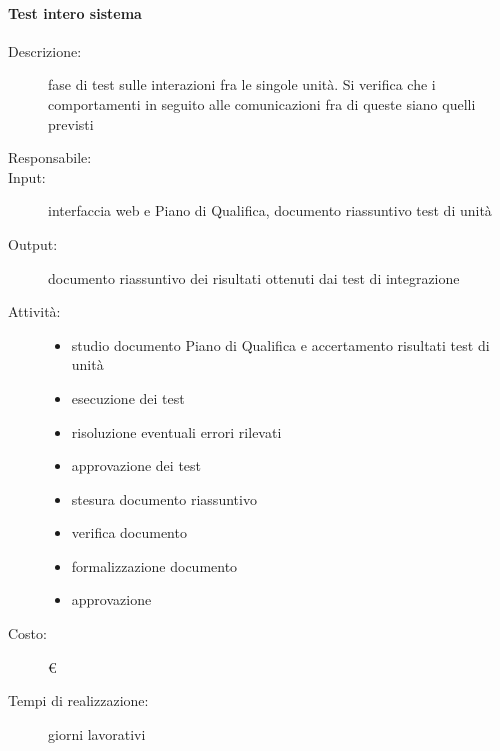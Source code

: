 \paragraph{Test intero sistema}
\begin{description}
\item[Descrizione:] fase di test sulle interazioni fra le singole unità. Si verifica che i comportamenti in seguito alle comunicazioni fra di queste siano quelli previsti 

\item[Responsabile:] 

\item[Input:] interfaccia web e Piano di Qualifica, documento riassuntivo test di unità 

\item[Output:] documento riassuntivo dei risultati ottenuti dai test di integrazione 

\item[Attività:]
\begin{itemize}
\item studio documento Piano di Qualifica e accertamento risultati test di unità
\item esecuzione dei test
\item risoluzione eventuali errori rilevati
\item approvazione dei test
\item stesura documento riassuntivo
\item verifica documento
\item formalizzazione documento
\item approvazione
\end{itemize}
\item[Costo:] \euro 
\item[Tempi di realizzazione:]  giorni lavorativi
\end{description}







